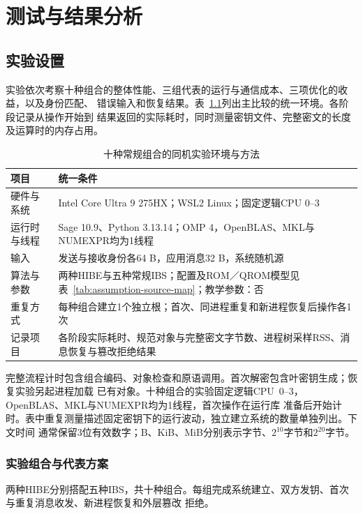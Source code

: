 \chapter{测试与结果分析}

\section{实验设置}
实验依次考察十种组合的整体性能、三组代表的运行与通信成本、三项优化的收益，以及身份匹配、
错误输入和恢复结果。表~\ref{tab:environments}列出主比较的统一环境。各阶段记录从操作开始到
结果返回的实际耗时，同时测量密钥文件、完整密文的长度及运算时的内存占用。

\begin{table}[H]
\centering\small
\caption{十种常规组合的同机实验环境与方法}
\label{tab:environments}
\begin{tabularx}{\textwidth}{@{}p{}X@{}}
\toprule
\rowcolor{black!8} 项目 & 统一条件 \\
\midrule
硬件与系统 & Intel Core Ultra 9 275HX；WSL2 Linux；固定逻辑CPU 0--3 \\
运行时与线程 & Sage 10.9、Python 3.13.14；OMP 4，OpenBLAS、MKL与NUMEXPR均为1线程 \\
输入 & 发送与接收身份各64 B，应用消息32 B，系统随机源 \\
算法与参数 & 两种HIBE与五种常规IBS；配置及ROM／QROM模型见表~\ref{tab:assumption-source-map}；教学参数：否 \\
重复方式 & 每种组合建立1个独立根；首次、同进程重复和新进程恢复后操作各1次 \\
记录项目 & 各阶段实际耗时、规范对象与完整密文字节数、进程树采样RSS、消息恢复与篡改拒绝结果 \\
\bottomrule
\end{tabularx}
\end{table}

完整流程计时包含组合编码、对象检查和原语调用。首次解密包含叶密钥生成；恢复实验另起进程加载
已有对象。十种组合的实验固定逻辑CPU~0--3，OpenBLAS、MKL与NUMEXPR均为1线程，首次操作在运行库
准备后开始计时。表中重复测量描述固定密钥下的运行波动，独立建立系统的数量单独列出。下文时间
通常保留3位有效数字；B、KiB、MiB分别表示字节、$2^{10}$字节和$2^{20}$字节。

\subsection{实验组合与代表方案}

两种HIBE分别搭配五种IBS，共十种组合。每组完成系统建立、双方发钥、首次与重复消息收发、新进程恢复和外层篡改
拒绝。

